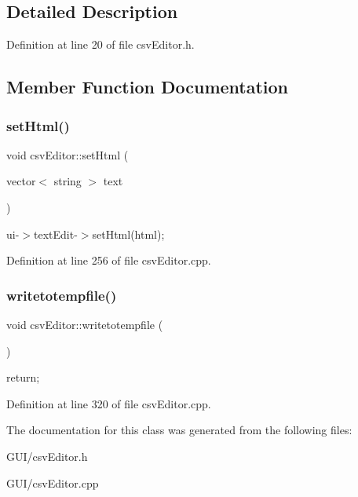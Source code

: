 \subsection{Detailed Description}


Definition at line 20 of file csv\+Editor.\+h.



\subsection{Member Function Documentation}
\mbox{\label{classcsv_editor_a4bba903f33dc4129a3c896978679ae74}} 
\subsubsection{\texorpdfstring{set\+Html()}{setHtml()}}
{\footnotesize\ttfamily void csv\+Editor\+::set\+Html (\begin{DoxyParamCaption}\item[{vector$<$ string $>$}]{text }\end{DoxyParamCaption})}

ui-\/$>$text\+Edit-\/$>$set\+Html(html); 

Definition at line 256 of file csv\+Editor.\+cpp.

\mbox{\label{classcsv_editor_aaddc114a926c5d1f9ebcfdec25d3471c}} 
\subsubsection{\texorpdfstring{writetotempfile()}{writetotempfile()}}
{\footnotesize\ttfamily void csv\+Editor\+::writetotempfile (\begin{DoxyParamCaption}{ }\end{DoxyParamCaption})}

return; 

Definition at line 320 of file csv\+Editor.\+cpp.



The documentation for this class was generated from the following files\+:\begin{DoxyCompactItemize}
\item 
G\+U\+I/csv\+Editor.\+h\item 
G\+U\+I/csv\+Editor.\+cpp\end{DoxyCompactItemize}
